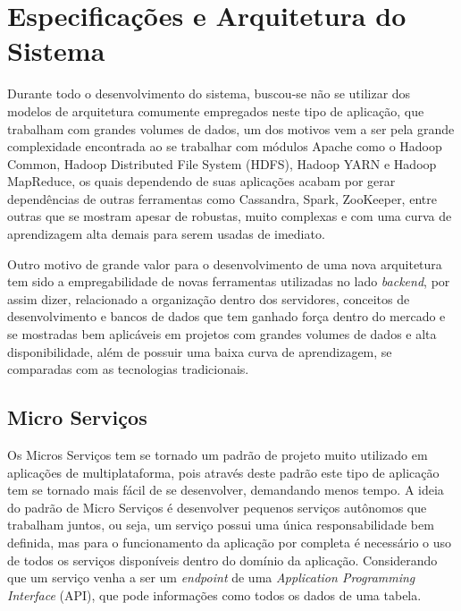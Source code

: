 \chapter{Especificações e Arquitetura do Sistema}
\label{chap:arquitetura}
Durante todo o desenvolvimento do sistema, buscou-se não se utilizar dos modelos de arquitetura comumente empregados neste tipo de aplicação, que trabalham com grandes volumes de dados, um dos motivos vem a ser pela grande complexidade encontrada ao se trabalhar com módulos Apache como o Hadoop Common, Hadoop Distributed File System (HDFS), Hadoop YARN e Hadoop MapReduce, os quais dependendo de suas aplicações acabam por gerar dependências de outras ferramentas como Cassandra, Spark, ZooKeeper, entre outras que se mostram apesar de robustas, muito complexas e com uma curva de aprendizagem alta demais para serem usadas de imediato.

Outro motivo de grande valor para o desenvolvimento de uma nova arquitetura tem sido a empregabilidade de novas ferramentas utilizadas no lado \textit{backend}, por assim dizer, relacionado a organização dentro dos servidores, conceitos de desenvolvimento e bancos de dados que tem ganhado força dentro do mercado e se mostradas bem aplicáveis em projetos com grandes volumes de dados e alta disponibilidade, além de possuir uma baixa curva de aprendizagem, se comparadas com as tecnologias tradicionais.

\section{Micro Serviços}
\label{sec:microserviços}
Os Micros Serviços tem se tornado um padrão de projeto muito utilizado em aplicações de multiplataforma, pois através deste padrão este tipo de aplicação tem se tornado mais fácil de se desenvolver, demandando menos tempo. A ideia do padrão de Micro Serviços é desenvolver pequenos serviços autônomos que trabalham juntos, ou seja, um serviço possui uma única responsabilidade bem definida, mas para o funcionamento da aplicação por completa é necessário o uso de todos os serviços disponíveis dentro do domínio da aplicação. Considerando que um serviço venha a ser um \textit{endpoint} de uma \textit{Application Programming Interface} (API), que pode informações como todos os dados de uma tabela.~\cite{newman2015building}


